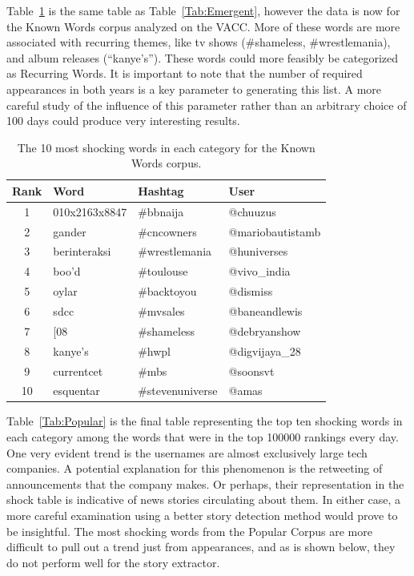 \documentclass{article}
\begin{document}
Table~\ref{Tab:Known} is the same table as Table~\ref{Tab:Emergent},
however the data is now for the Known Words corpus analyzed on the VACC.
More of these words are more associated with recurring themes,
like tv shows (\#shameless, \#wrestlemania),
and album releases (``kanye's'').
These words could more feasibly be categorized as Recurring Words.
It is important to note that the number of required appearances in both
years is a key parameter to generating this list.
A more careful study of the influence of this parameter rather than an
arbitrary choice of 100 days could produce very interesting results.\par

\begin{table}
    \centering
    \caption{\label{Tab:Known} The 10 most shocking words in each category for 
the Known Words corpus.}
    \begin{tabular}{clll}
        \toprule
        Rank & Word & Hashtag & User \\
        \midrule
        1 & 010x2163x8847 & \#bbnaija & @chuuzus \\
        2 & gander & \#cncowners & @mariobautistamb \\
        3 & berinteraksi & \#wrestlemania & @huniverses \\
        4 & boo'd & \#toulouse & @vivo\_india \\
        5 & oylar & \#backtoyou & @dismiss \\
        6 & sdcc & \#mvsales & @baneandlewis \\
        7 & [08 & \#shameless & @debryanshow \\
        8 & kanye's & \#hwpl & @digvijaya\_28 \\
        9 & currentcet & \#mbs & @soonsvt \\
        10 & esquentar & \#stevenuniverse & @amas\\
        \bottomrule
    \end{tabular}
\end{table}

Table~\ref{Tab:Popular} is the final table representing the top ten shocking words
in each category among the words that were in the top 100000 rankings every
day.
One very evident trend is the usernames are almost exclusively large tech
companies.
A potential explanation for this phenomenon is the retweeting of announcements
that the company makes.
Or perhaps,
their representation in the shock table is indicative of news stories
circulating about them.
In either case,
a more careful examination using a better story detection method would prove
to be insightful.
The most shocking words from the Popular Corpus are more difficult to
pull out a trend just from appearances,
and as is shown below,
they do not perform well for the story extractor.\par
\end{document}
